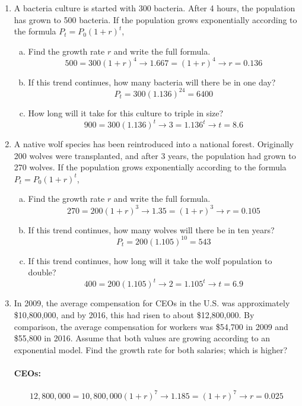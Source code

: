 \begin{enumerate}
\item A bacteria culture is started with 300 bacteria.  After 4 hours, the population has grown to 500 bacteria.  If the population grows exponentially according to the formula $P_t = P_0(1+r)^t$,
\begin{enumerate}[(a)]
\item Find the growth rate $r$ and write the full formula. 
\[500 = 300(1 + r)^4 \longrightarrow 1.667 = (1 + r)^4 \longrightarrow r = 0.136\]
\item If this trend continues, how many bacteria will there be in one day? 
\[P_t = 300(1.136)^{24} = 6400\]
\item How long will it take for this culture to triple in size? 
\[900 = 300(1.136)^t \longrightarrow 3 = 1.136^t \longrightarrow t = 8.6\]
\end{enumerate}

\item A native wolf species has been reintroduced into a national forest.  Originally 200 wolves were transplanted, and after 3 years, the population had grown to 270 wolves.  If the population grows exponentially according to the formula $P_t = P_0(1+r)^t$,
\begin{enumerate}[(a)]
\item Find the growth rate $r$ and write the full formula. 
\[270 = 200(1 + r)^3 \longrightarrow 1.35 = (1 + r)^3 \longrightarrow r = 0.105\]
\item If this trend continues, how many wolves will there be in ten years? 
\[P_t = 200(1.105)^{10} = 543\]
\item If this trend continues, how long will it take the wolf population to double? 
\[400 = 200(1.105)^t \longrightarrow 2 = 1.105^t \longrightarrow t = 6.9\]
\end{enumerate}

\item In 2009, the average compensation for CEOs in the U.S. was approximately \$10,800,000, and by 2016, this had risen to about \$12,800,000.  By comparison, the average compensation for workers was \$54,700 in 2009 and \$55,800 in 2016.  Assume that both values are growing according to an exponential model.  Find the growth rate for both salaries; which is higher? 
\paragraph{CEOs:} \[12,800,000 = 10,800,000(1 + r)^7 \longrightarrow 1.185 = (1 + r)^7 \longrightarrow r = 0.025\]

\end{enumerate}
